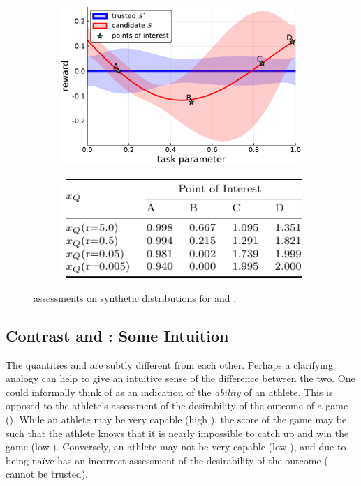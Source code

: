 \begin{figure}[tbp]
    \centering
    \begin{subfigure}[c]{0.65\linewidth}
        \centering
        \includegraphics[width=0.7\linewidth]{Figures/p1.pdf}
        \vfill
    \end{subfigure}%
    \hfill
    \begin{subfigure}[t]{0.35\linewidth}
        \centering
        \includegraphics[width=1.0\linewidth]{Figures/p1_table.pdf}
    \end{subfigure} 
    \caption{\xQ{} assessments on synthetic \pri{} distributions for \solvetrust{} and \solvecand{}. }
    \label{fig:sq_thry1}
\end{figure}

\subsection{Contrast \xQ{} and \xO{}: Some Intuition}
The quantities \xQ{} and \xO{} are subtly different from each other. Perhaps a clarifying analogy can help to give an intuitive sense of the difference between the two. One could informally think of \xQ{} as an indication of the \emph{ability} of an athlete. This is opposed to the athlete's assessment of the desirability of the outcome of a game (\xO). While an athlete may be very capable (high \xQ), the score of the game may be such that the athlete knows that it is nearly impossible to catch up and win the game (low \xO). Conversely, an athlete may not be very capable (low \xQ), and due to being na\"{i}ve has an incorrect assessment of the desirability of the outcome (\xO{} cannot be trusted).

